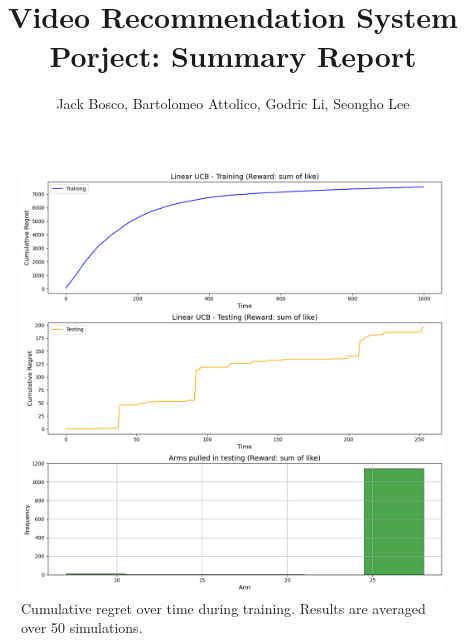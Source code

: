 \documentclass{article}
\title{Video Recommendation System Porject: Summary Report}
\author{Jack Bosco, Bartolomeo Attolico, Godric Li, Seongho Lee}
\begin{document}
\maketitle









\begin{figure}
    \includegraphics[width=\textwidth]{regret_plot.png}
    \caption{Cumulative regret over time during training. Results are averaged over 50 simulations.}
    \label{regret_plot}
\end{figure}




\end{document}
